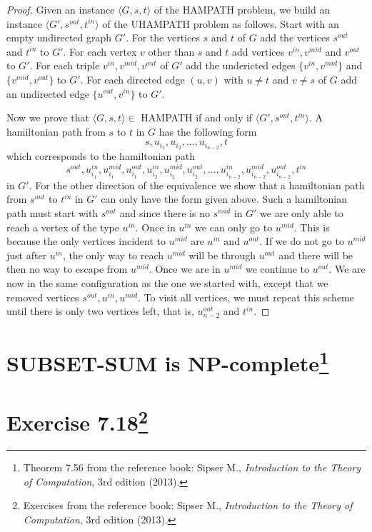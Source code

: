 \documentclass{article}
\begin{document}
\begin{proof}
	Given an instance \(\langle G, s, t \rangle\) of the HAMPATH problem, we
	build an instance \(\langle G', s^{out}, t^{in}\rangle\) of the UHAMPATH
	problem as follows. Start with an empty undirected graph \(G'\). For the
	vertices \(s\) and \(t\) of \(G\) add the vertices \(s^{out}\) and
	\(t^{in}\) to \(G'\). For each vertex \(v\) other than \(s\) and \(t\) add
	vertices \(v^{in}, v^{mid}\) and \(v^{out}\) to \(G'\). For each triple
	\(v^{in},v^{mid},v^{out}\) of \(G'\) add the undericted edges \(\{v^{in},
	v^{mid}\}\) and \(\{v^{mid},v^{out}\}\) to \(G'\).
	For each directed
	edge \((u,v)\) with \(u \neq t\) and \(v \neq s\) of \(G\) add an
	undirected
	edge \(\{u^{out},v^{in}\}\) to \(G'\).

	Now we prove that \(\langle G, s, t \rangle \in\) HAMPATH if and only if
	\(\langle G', s^{out}, t^{in}\rangle\). A hamiltonian path from \(s\) to
	\(t\) in \(G\) has the following form
	\begin{displaymath}
		s, u_{i_1}, u_{i_2}, \ldots, u_{i_{n-2}}, t
	\end{displaymath}
	which corresponds to the hamiltonian path
	\begin{displaymath}
		s^{out}, u^{in}_{i_1}, u^{mid}_{i_1}, u^{out}_{i_1}, u^{in}_{i_2},
		u^{mid}_{i_2}, u^{out}_{i_2}, \ldots, u^{in}_{i_{n-2}}, u^{mid}_{i_{n-2}},
		u^{out}_{i_{n-2}}, t^{in}
	\end{displaymath}
	in \(G'\). For the other direction of the equivalence we show that a
	hamiltonian path from \(s^{out}\) to \(t^{in}\) in \(G'\) can only have the
	form given above. Such a hamiltonian path must start with \(s^{out}\) and
	since there is no \(s^{mid}\) in \(G'\) we are only able to reach a vertex
	of the type \(u^{in}\). Once in \(u^{in}\) we can only go to \(u^{mid}\).
	This is because the only vertices incident to \(u^{mid}\) are \(u^{in}\) and
	\(u^{out}\). If we do not go to \(u^{mid}\) just after \(u^{in}\),
	the only way to reach \(u^{mid}\) will be through \(u^{out}\) and there
	will be then no way to escape from \(u^{mid}\). Once we are in \(u^{mid}\)
	we continue to \(u^{out}\). We are now in the same configuration as the one
	we started with, except that we removed vertices
	\(s^{out},u^{in},u^{mid}\). To visit all vertices, we must repeat this
	scheme until there is only two vertices left, that is, \(u^{out}_{n-2}\)
	and \(t^{in}\).
\end{proof}

\section{SUBSET-SUM is NP-complete\footnote{%
Theorem 7.56 from the reference book: Sipser M.,
\emph{Introduction to the Theory of Computation}, 3rd edition (2013).}}

\section{Exercise 7.18\footnote{%
Exercises from the reference book: Sipser M.,
\emph{Introduction to the Theory of Computation}, 3rd edition (2013).}}
\end{document}
